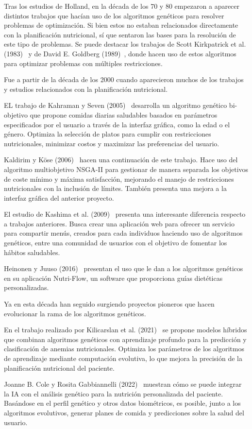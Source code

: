 Tras los estudios de Holland, en la década de los 70 y 80 empezaron a aparecer distintos trabajos que hacían uso de los algoritmos genéticos para resolver problemas de optimización. Si bien estos no estaban relacionados directamente con la planificación nutricional, sí que sentaron las bases para la resolución de este tipo de problemas. Se puede destacar los trabajos de Scott Kirkpatrick et al. (1983)~\cite{kirkpatrick1983} y de David E. Goldberg (1989)~\cite{goldberg1989}, donde hacen uso de estos algoritmos para optimizar problemas con múltiples restricciones.

Fue a partir de la década de los 2000 cuando aparecieron muchos de los trabajos y estudios relacionados con la planificación nutricional.

EL trabajo de Kahraman y Seven (2005)~\cite{kahraman2005} desarrolla un algoritmo genético bi-objetivo que propone comidas diarias saludables basados en parámetros especificados por el usuario a través de la interfaz gráfica, como la edad o el género. Optimiza la selección de platos para cumplir con restricciones nutricionales, minimizar costos y maximizar las preferencias del usuario.

Kaldirim y Köse (2006)~\cite{kaldirim2006} hacen una continuación de este trabajo. Hace uso del algoritmo multiobjetivo NSGA-II para gestionar de manera separada los objetivos de coste mínimo y máxima satisfacción, mejorando el manejo de restricciones nutricionales con la inclusión de límites. También presenta una mejora a la interfaz gráfica del anterior proyecto.

El estudio de Kashima et al. (2009)~\cite{kashima2009} presenta una interesante diferencia respecto a trabajos anteriores. Busca crear una aplicación web para ofrecer un servicio para compartir menús, creados para cada individuos haciendo uso de algoritmos genéticos, entre una comunidad de usuarios con el objetivo de fomentar los hábitos saludables.

Heinonen y Juuso (2016)~\cite{heinonen2016} presentan el uso que le dan a los algoritmos genéticos en su aplicación Nutri-Flow, un software que proporciona guías dietéticas personalizadas.

Ya en esta década han seguido surgiendo proyectos pioneros que hacen evolucionar la rama de los algoritmos genéticos.

En el trabajo realizado por Kilicarslan et al. (2021)~\cite{KILICARSLAN2021102231} se propone modelos híbridos que combinan algoritmos genéticos con aprendizaje profundo para la predicción y clasificación de anemias nutricionales. Optimiza los parámetros de los algoritmos de aprendizaje mediante computación evolutiva, lo que mejora la precisión de la planificación nutricional del paciente.

Joanne B. Cole y Rosita Gabbiannelli (2022)~\cite{cole2022} muestran cómo se puede integrar la IA con el análisis genético para la nutrición personalizada del paciente. Basándose en el perfil genético y otros datos biométricos, es posible, junto a los algoritmos evolutivos, generar planes de comida y predicciones sobre la salud del usuario.





